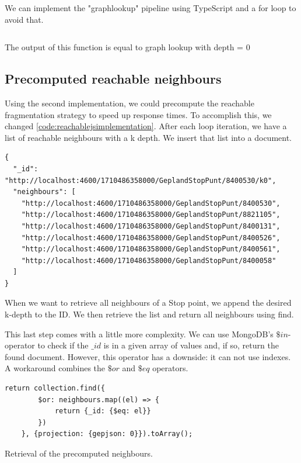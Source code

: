 We can implement the "graphlookup" pipeline using TypeScript and a for loop to avoid that. 

\begin{listing}[H]
    \inputminted[linenos,frame=single,breaklines]{TypeScript}{code/one_lookup_pipeline.ts}
    \caption{The output of this function is equal to graph lookup with depth = 0}
    \label{code:reachablejsimplementation}
\end{listing}


\subsection{Precomputed reachable neighbours}
Using the second implementation, we could precompute the reachable fragmentation strategy to speed up response times. To accomplish this, we changed \autoref{code:reachablejsimplementation}. After each loop iteration, we have a list of reachable neighbours with a k depth. We insert that list into a document. 

\begin{listing}[H]
    \begin{verbatim}
{
  "_id": "http://localhost:4600/1710486358000/GeplandStopPunt/8400530/k0",
  "neighbours": [
    "http://localhost:4600/1710486358000/GeplandStopPunt/8400530",
    "http://localhost:4600/1710486358000/GeplandStopPunt/8821105",
    "http://localhost:4600/1710486358000/GeplandStopPunt/8400131",
    "http://localhost:4600/1710486358000/GeplandStopPunt/8400526",
    "http://localhost:4600/1710486358000/GeplandStopPunt/8400561",
    "http://localhost:4600/1710486358000/GeplandStopPunt/8400058"
  ]
}
    \end{verbatim}
\end{listing}

When we want to retrieve all neighbours of a Stop point, we append the desired k-depth to the ID. We then retrieve the list and return all neighbours using find.

This last step comes with a little more complexity. We can use MongoDB's $\$in$- operator to check if the $\_id$ is in a given array of values and, if so, return the found document. However, this operator has a downside: it can not use indexes. A workaround combines the $\$or$ and $\$eq$ operators.
\begin{listing}[H]
\begin{verbatim}
return collection.find({
        $or: neighbours.map((el) => {
            return {_id: {$eq: el}}
        })
    }, {projection: {gepjson: 0}}).toArray();
\end{verbatim}
\caption{Retrieval of the precomputed neighbours.}
\end{listing}
